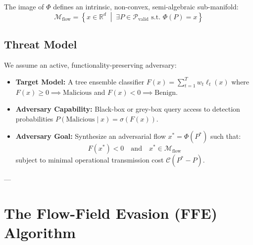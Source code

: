 \documentclass[10pt,journal,compsoc]{IEEEtran}
\begin{document}
The image of $\Phi$ defines an intrinsic, non-convex, semi-algebraic sub-manifold:
\begin{equation}
    \mathcal{M}_{\text{flow}} = \left\{ x \in \mathbb{R}^d \;\middle|\; \exists P \in \mathcal{P}_{\text{valid}} \text{ s.t. } \Phi(P) = x \right\}
\end{equation}

\subsection{Threat Model}
We assume an active, functionality-preserving adversary:
\begin{itemize}
    \item \textbf{Target Model:} A tree ensemble classifier $F(x) = \sum_{t=1}^T w_t \ell_t(x)$ where $F(x) \ge 0 \implies \text{Malicious}$ and $F(x) < 0 \implies \text{Benign}$.
    \item \textbf{Adversary Capability:} Black-box or grey-box query access to detection probabilities $P(\text{Malicious} \mid x) = \sigma(F(x))$.
    \item \textbf{Adversary Goal:} Synthesize an adversarial flow $x^* = \Phi(P^*)$ such that:
    \begin{equation}
        F(x^*) < 0 \quad \text{and} \quad x^* \in \mathcal{M}_{\text{flow}}
    \end{equation}
    subject to minimal operational transmission cost $\mathcal{C}(P^* - P)$.
\end{itemize}

---

\section{The Flow-Field Evasion (FFE) Algorithm}
\end{document}
